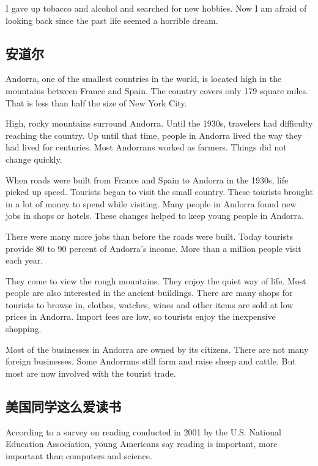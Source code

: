 I gave up tobacco and alcohol and searched for new
hobbies. Now I am afraid of looking back since the past
life seemed a horrible dream.
\subsection{安道尔}
\begin{margintable}\vspace{-2cm}\footnotesize
\end{margintable}
Andorra, one of the smallest countries in the world, is located
high in the mountains between France and Spain.
The country covers only 179 square miles. That is less
than half the size of New York City.

High, rocky mountains surround Andorra. Until the
1930s, travelers had difficulty reaching the country. Up until
that time, people in Andorra lived the way they had lived
for centuries. Most Andorrans worked as farmers. Things
did not change quickly.

When roads were built from France and Spain to Andorra
in the 1930s, life picked up speed. Tourists began
to visit the small country. These tourists brought in a lot of
money to spend while visiting. Many people in Andorra
found new jobs in shops or hotels. These changes helped
to keep young people in Andorra.

There were many more jobs than before the roads were
built. Today tourists provide 80 to 90 percent of Andorra's
income. More than a million people visit each year.

They come to view the rough mountains. They enjoy the
quiet way of life. Most people are also interested in the ancient buildings. There are many shops for tourists to browse
in, clothes, watches, wines and other items are sold at low
prices in Andorra. Import fees are low, so tourists enjoy the
inexpensive shopping.

Most of the businesses in Andorra are owned by its citizens.
There are not many foreign businesses. Some Andorrans still farm and raise sheep and cattle. But most
are now involved with the tourist trade.

\subsection{美国同学这么爱读书}
\begin{margintable}\vspace{-2cm}\footnotesize
\end{margintable}
According to a survey on reading conducted in 2001 by
the U.S. National Education Association, young Americans
say reading is important, more important than computers
and science.

